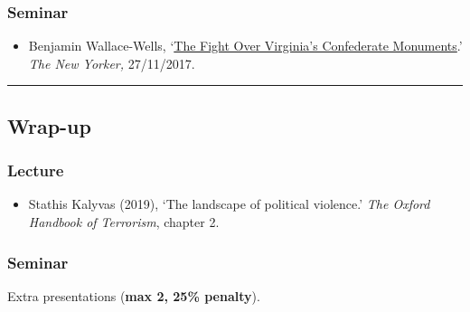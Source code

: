\documentclass[12pt, a4paper]{article}
\begin{document}
\subsubsection*{Seminar}

\begin{itemize}
\setlength\itemsep{0pt}
\item Benjamin Wallace-Wells, `\href{https://www.newyorker.com/magazine/2017/12/04/the-fight-over-virginias-confederate-monuments}{The Fight Over Virginia’s Confederate Monuments}.' \textit{The New Yorker,} 27/11/2017.
\end{itemize}


\hrule %

\subsection{Wrap-up} \label{wrap_up}

\subsubsection*{Lecture}

\begin{itemize}
\setlength\itemsep{0pt}
\item Stathis Kalyvas (2019), `The landscape of political violence.' \textit{The Oxford Handbook of Terrorism}, chapter 2.
\end{itemize}

\subsubsection*{Seminar}

Extra presentations (\textbf{max 2, 25\% penalty}).
\end{document}
